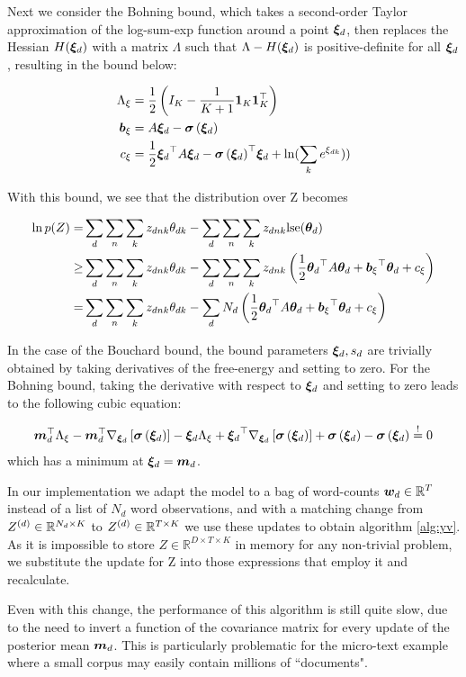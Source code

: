 Next we consider the Bohning bound\cite{Bohning1988}, which takes a second-order Taylor approximation of the log-sum-exp function around a point ${ \bm \xi_d}$, then replaces the Hessian $H({ \bm \xi_d})$ with a matrix $\Lambda$ such that $\Lambda - H({ \bm \xi_d})$ is positive-definite for all ${ \bm \xi_d}$, resulting in the bound below:

\begin{align}
{ \Lambda_{\xi} } & = \frac{1}{2} \left(I_K - \frac{1}{K+1}\mathbf{1}_K\mathbf{1}_K^\top   \right) \\
{ \bm b_{\xi} } & = A { \bm \xi_d}  - { \bm \sigma\left( { \bm \xi_d} \right) } \\
{ c_{\xi} } & = \frac{1}{2} { \bm \xi_d}^\top A { \bm \xi_d} - { \bm \sigma\left( { \bm \xi_d} \right) }^\top{  \bm \xi _d} + \ln(\sum_k e^{{\xi_{dk}}}))
\end{align} 


With this bound, we see that the distribution over Z becomes

\begin{align}
\ln p(Z) = & \sum_d \sum_n \sum_k { z_{dnk} } { \theta_{dk} } - \sum_d \sum_n \sum_k { z_{dnk} } \text{lse}({ \bm \theta_d }) \\
\geq & \sum_d \sum_n \sum_k { z_{dnk} } { \theta_{dk} } - \sum_d \sum_n \sum_k { z_{dnk} } \left( \frac{1}{2} { \bm \theta_d }^\top A { \bm \theta_d } + { \bm b_{\xi} }^\top{  \bm \theta _d } + { c_{\xi} } \right)\\
= & \sum_d \sum_n \sum_k { z_{dnk} } { \theta_{dk} } - \sum_d N_d \left( \frac{1}{2} { \bm \theta_d }^\top A { \bm \theta_d } + { \bm b_{\xi} }^\top{  \bm \theta _d } + { c_{\xi} } \right)
\end{align}

In the case of the Bouchard bound, the bound parameters ${ \bm \xi_d}, s_d$ are trivially obtained by taking derivatives of the free-energy and setting to zero. For the Bohning bound, taking the derivative with respect to ${ \bm \xi_d}$ and setting to zero leads to the following cubic equation:

\begin{align}
\bm m_d^\top { \Lambda_{\xi} }
- \bm m_d^\top{  { \nabla_{{  \bm \xi _d}} } \left[  {  \bm \sigma \left( {  \bm \xi _d}\right) }  \right] }
- { \bm \xi_d} { \Lambda_{\xi} }
+ { \bm \xi_d}^\top{  { \nabla_{{  \bm \xi _d}} } \left[  {  \bm \sigma \left( {  \bm \xi _d}\right) }  \right] }
+ { \bm \sigma\left( { \bm \xi_d} \right) }
- { \bm \sigma\left( { \bm \xi_d} \right) }
\overset{!}{=} 0
\end{align}
which has a minimum at ${ \bm \xi_d} = \bm m_d$.

In our implementation we adapt the model to a bag of word-counts $\bm w_d \in { \mathbb{R}^{T} }$ instead of a list of $N_d$ word observations, and with a matching change from $Z^{(d)} \in { \mathbb{R}^{N_d \times K} }$ to $Z^{(d)} \in { \mathbb{R}^{T \times K} }$ we use these updates to obtain algorithm \ref{alg:yv}. As it is impossible to store $Z \in \mathbb{R}^{D\times T \times K}$ in memory for any non-trivial problem, we substitute the update for Z into those expressions that employ it and recalculate.

Even with this change, the performance of this algorithm is still quite slow, due to the need to invert a function of the covariance matrix for every update of the posterior mean $\bm m_d$. This is particularly problematic for the micro-text example where a small corpus may easily contain millions of ``documents". 

